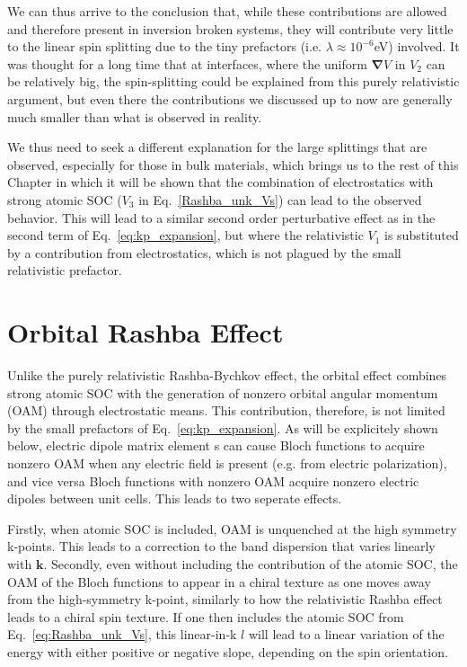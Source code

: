 We can thus arrive to the conclusion that, while these contributions are allowed and therefore present in inversion broken systems, they will contribute very little to the linear spin splitting due to the tiny prefactors (i.e. $\lambda \approx 10^{-6}$eV) involved.
It was thought for a long time that at interfaces, where the uniform $\bm{\nabla}V$ in $V_2$ can be relatively big, the spin-splitting could be explained from this purely relativistic argument, but even there the contributions we discussed up to now are generally much smaller than what is observed in reality. 

We thus need to seek a different explanation for the large splittings that are observed, especially for those in bulk materials, which brings us to the rest of this Chapter in which it will be shown that the combination of electrostatics with strong atomic SOC ($V_3$ in Eq.~\ref{Rashba_unk_Vs}) can lead to the observed behavior.
This will lead to a similar second order perturbative effect as in the second term of Eq.~\ref{eq:kp_expansion}, but where the relativistic $V_1$ is substituted by a contribution from electrostatics, which is not plagued by the small relativistic prefactor.

\section{Orbital Rashba Effect}
Unlike the purely relativistic Rashba-Bychkov effect, the orbital effect combines strong atomic SOC with the generation of nonzero orbital angular momentum (OAM) through electrostatic means.
This contribution, therefore, is not limited by the small prefactors of Eq.~\ref{eq:kp_expansion}. As will be explicitely shown below, electric dipole matrix element s can cause Bloch functions to acquire nonzero OAM when any electric field is present (e.g. from electric polarization), and vice versa Bloch functions with nonzero OAM  acquire nonzero electric dipoles between unit cells\cite{Petersen2000,Park2011,Go2016}. This leads to two seperate effects.

Firstly, when atomic SOC is included, OAM is unquenched at the high symmetry k-points. This leads to a correction to the band dispersion that varies linearly with $\bm{k}$. Secondly, even without including the contribution of the atomic SOC, the OAM of the Bloch functions to appear in a chiral texture as one moves away from the high-symmetry k-point, similarly to how the relativistic Rashba effect leads to a chiral spin texture. If one then includes the atomic SOC from Eq.~\ref{eq:Rashba_unk_Vs}, this linear-in-k $l$ will lead to a linear variation of the energy with either positive or negative slope, depending on the spin orientation.

